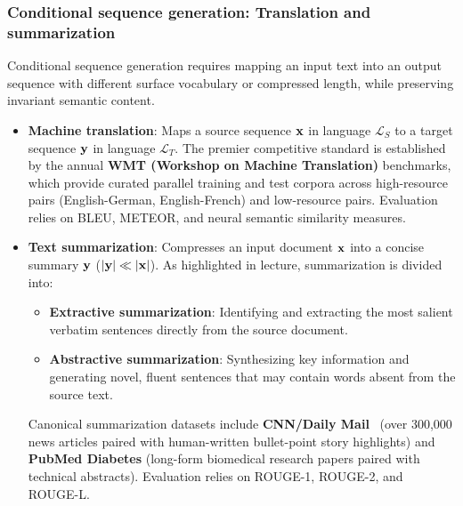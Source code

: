\documentclass[../../main.tex]{subfiles}
\begin{document}
\subsubsection{Conditional sequence generation: Translation and summarization}
\label{subsec:translation_summarization}
Conditional sequence generation requires mapping an input text into an output sequence with different surface vocabulary or compressed length, while preserving invariant semantic content.
\begin{itemize}
    \item \textbf{Machine translation}: Maps a source sequence $\mathbf{x}$ in language $\mathcal{L}_S$ to a target sequence $\mathbf{y}$ in language $\mathcal{L}_T$. The premier competitive standard is established by the annual \textbf{WMT (Workshop on Machine Translation)} benchmarks, which provide curated parallel training and test corpora across high-resource pairs (English-German, English-French) and low-resource pairs. Evaluation relies on BLEU, METEOR, and neural semantic similarity measures.
    \item \textbf{Text summarization}: Compresses an input document $\mathbf{x}$ into a concise summary $\mathbf{y}$ ($|\mathbf{y}| \ll |\mathbf{x}|$). As highlighted in lecture, summarization is divided into:
    \begin{itemize}
        \item \textbf{Extractive summarization}: Identifying and extracting the most salient verbatim sentences directly from the source document.
        \item \textbf{Abstractive summarization}: Synthesizing key information and generating novel, fluent sentences that may contain words absent from the source text.
    \end{itemize}
    Canonical summarization datasets include \textbf{CNN/Daily Mail}~\cite{lin2004rouge} (over 300,000 news articles paired with human-written bullet-point story highlights) and \textbf{PubMed Diabetes} (long-form biomedical research papers paired with technical abstracts). Evaluation relies on ROUGE-1, ROUGE-2, and ROUGE-L.
\end{itemize}
\end{document}
